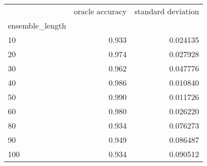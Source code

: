 \begin{tabular}{lrr}
\toprule
{} &  oracle accuracy &  standard deviation \\
ensemble\_length &                  &                     \\
\midrule
10              &            0.933 &            0.024135 \\
20              &            0.974 &            0.027928 \\
30              &            0.962 &            0.047776 \\
40              &            0.986 &            0.010840 \\
50              &            0.990 &            0.011726 \\
60              &            0.980 &            0.026220 \\
80              &            0.934 &            0.076273 \\
90              &            0.949 &            0.086487 \\
100             &            0.934 &            0.090512 \\
\bottomrule
\end{tabular}
